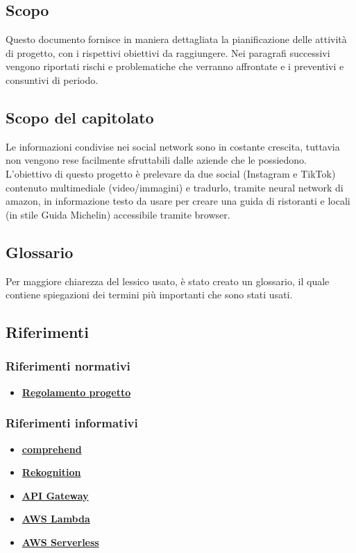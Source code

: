 \subsection{Scopo}
Questo documento fornisce in maniera dettagliata la pianificazione delle attività di
progetto, con i rispettivi obiettivi da raggiungere. Nei paragrafi successivi vengono
riportati rischi e problematiche che verranno affrontate e i preventivi e consuntivi 
di periodo.

\subsection{Scopo del capitolato}
Le informazioni condivise nei social network sono in costante crescita, tuttavia 
non vengono rese facilmente sfruttabili dalle aziende che le possiedono. 
L'obiettivo di questo progetto è prelevare da due social (Instagram e TikTok) 
contenuto multimediale (video/immagini) e tradurlo, tramite neural network di 
amazon, in informazione testo da usare per creare una guida di ristoranti e locali
(in stile Guida Michelin) accessibile tramite browser. 

\subsection{Glossario}
Per maggiore chiarezza del lessico usato, è stato creato un glossario, il quale 
contiene spiegazioni dei termini più importanti che sono stati usati.

\subsection{Riferimenti} %
\subsubsection{Riferimenti normativi}
\begin{itemize}
	\item
	\href{https://www.math.unipd.it/~tullio/IS-1/2021/Dispense/PD2.pdf}{\textbf{Regolamento progetto}}
	
\end{itemize}
\subsubsection{Riferimenti informativi}
\begin{itemize}
	\item \href{What is Amazon Comprehend? - Amazon Comprehend}{\textbf{comprehend}}
	\item
	\href{What is Amazon Rekognition? - Amazon Rekognition}{\textbf{Rekognition}}
	\item
	\href{What is Amazon API Gateway? - Amazon API Gateway}{\textbf{API Gateway}}
	\item
	\href{What is AWS Lambda? - AWS Lambda (amazon.com}{\textbf{AWS Lambda}}
	\item
	\href{What is the AWS Serverless Application Model (AWS SAM)? - AWS Serverless Application Model (amazon.com}{\textbf{AWS Serverless}}
\end{itemize}
